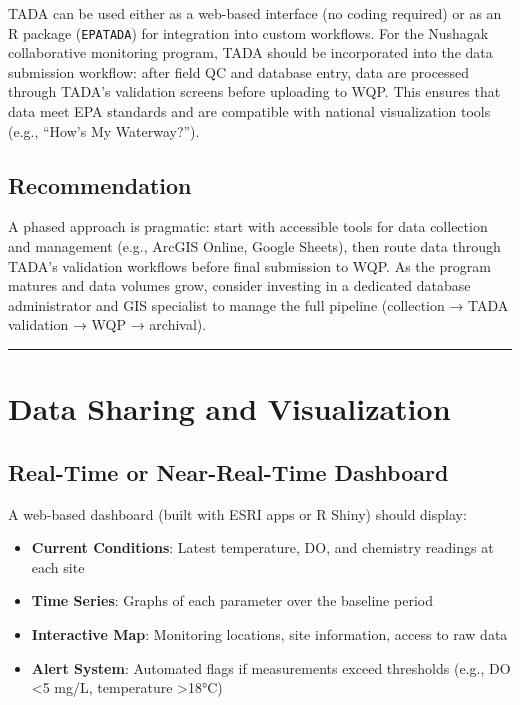 \documentclass[
  letterpaper,
]{scrbook}
\providecommand{\tightlist}{%
  \setlength{\itemsep}{0pt}\setlength{\parskip}{0pt}}\usepackage{longtable,booktabs,array}
\begin{document}
TADA can be used either as a web-based interface (no coding required) or
as an R package (\texttt{EPATADA}) for integration into custom
workflows. For the Nushagak collaborative monitoring program, TADA
should be incorporated into the data submission workflow: after field QC
and database entry, data are processed through TADA's validation screens
before uploading to WQP. This ensures that data meet EPA standards and
are compatible with national visualization tools (e.g., ``How's My
Waterway?'').

\subsection{Recommendation}\label{recommendation}

A phased approach is pragmatic: start with accessible tools for data
collection and management (e.g., ArcGIS Online, Google Sheets), then
route data through TADA's validation workflows before final submission
to WQP. As the program matures and data volumes grow, consider investing
in a dedicated database administrator and GIS specialist to manage the
full pipeline (collection → TADA validation → WQP → archival).

\begin{center}\rule{0.5\linewidth}{0.5pt}\end{center}

\section{Data Sharing and
Visualization}\label{data-sharing-and-visualization}

\subsection{Real-Time or Near-Real-Time
Dashboard}\label{real-time-or-near-real-time-dashboard}

A web-based dashboard (built with ESRI apps or R Shiny) should display:

\begin{itemize}
\tightlist
\item
  \textbf{Current Conditions}: Latest temperature, DO, and chemistry
  readings at each site
\item
  \textbf{Time Series}: Graphs of each parameter over the baseline
  period
\item
  \textbf{Interactive Map}: Monitoring locations, site information,
  access to raw data
\item
  \textbf{Alert System}: Automated flags if measurements exceed
  thresholds (e.g., DO \textless5 mg/L, temperature \textgreater18°C)
\end{itemize}
\end{document}
